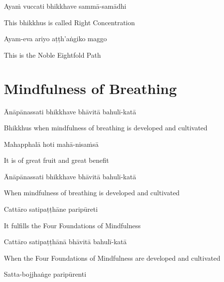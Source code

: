 Ayaṁ vuccati bhikkhave sammā-samādhi

\begin{cprenglish}
This bhikkhus is called Right Concentration
\end{cprenglish}

Ayam-eva ariyo aṭṭh'aṅgiko maggo

\begin{cprenglish}
This is the Noble Eightfold Path
\end{cprenglish}


\clearpage

\section*{Mindfulness of Breathing}

\begin{leader}
\end{leader}

Ānāpānassati bhikkhave bhāvitā bahulī-katā

\begin{cprenglish}
Bhikkhus when mindfulness of breathing is developed and cultivated
\end{cprenglish}

Mahapphalā hoti mahā-nisaṁsā

\begin{cprenglish}
It is of great fruit and great benefit
\end{cprenglish}

Ānāpānassati bhikkhave bhāvitā bahulī-katā

\begin{cprenglish}
When mindfulness of breathing is developed and cultivated
\end{cprenglish}

Cattāro satipaṭṭhāne paripūreti

\begin{cprenglish}
It fulfills the Four Foundations of Mindfulness
\end{cprenglish}

Cattāro satipaṭṭhānā bhāvitā bahulī-katā

\begin{cprenglish}
When the Four Foundations of Mindfulness are developed and cultivated
\end{cprenglish}

Satta-bojjhaṅge paripūrenti

